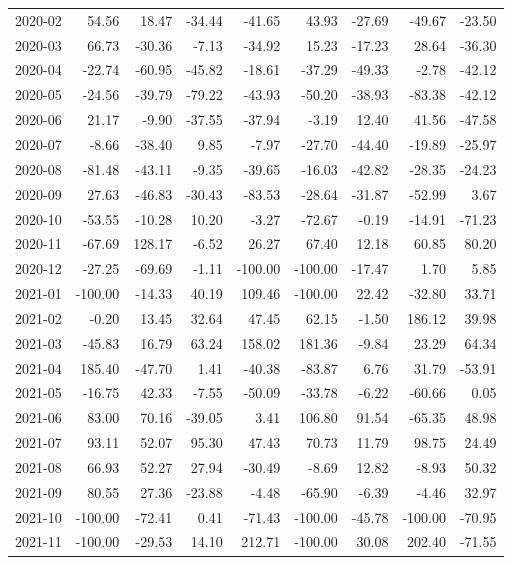 \begin{table}[ht]
\begin{tabular}{lrrrrrrrr}
  2020-02 & 54.56 & 18.47 & -34.44 & -41.65 & 43.93 & -27.69 & -49.67 & -23.50 \\ 
  2020-03 & 66.73 & -30.36 & -7.13 & -34.92 & 15.23 & -17.23 & 28.64 & -36.30 \\ 
  2020-04 & -22.74 & -60.95 & -45.82 & -18.61 & -37.29 & -49.33 & -2.78 & -42.12 \\ 
  2020-05 & -24.56 & -39.79 & -79.22 & -43.93 & -50.20 & -38.93 & -83.38 & -42.12 \\ 
  2020-06 & 21.17 & -9.90 & -37.55 & -37.94 & -3.19 & 12.40 & 41.56 & -47.58 \\ 
  2020-07 & -8.66 & -38.40 & 9.85 & -7.97 & -27.70 & -44.40 & -19.89 & -25.97 \\ 
  2020-08 & -81.48 & -43.11 & -9.35 & -39.65 & -16.03 & -42.82 & -28.35 & -24.23 \\ 
  2020-09 & 27.63 & -46.83 & -30.43 & -83.53 & -28.64 & -31.87 & -52.99 & 3.67 \\ 
  2020-10 & -53.55 & -10.28 & 10.20 & -3.27 & -72.67 & -0.19 & -14.91 & -71.23 \\ 
  2020-11 & -67.69 & 128.17 & -6.52 & 26.27 & 67.40 & 12.18 & 60.85 & 80.20 \\ 
  2020-12 & -27.25 & -69.69 & -1.11 & -100.00 & -100.00 & -17.47 & 1.70 & 5.85 \\ 
  2021-01 & -100.00 & -14.33 & 40.19 & 109.46 & -100.00 & 22.42 & -32.80 & 33.71 \\ 
  2021-02 & -0.20 & 13.45 & 32.64 & 47.45 & 62.15 & -1.50 & 186.12 & 39.98 \\ 
  2021-03 & -45.83 & 16.79 & 63.24 & 158.02 & 181.36 & -9.84 & 23.29 & 64.34 \\ 
  2021-04 & 185.40 & -47.70 & 1.41 & -40.38 & -83.87 & 6.76 & 31.79 & -53.91 \\ 
  2021-05 & -16.75 & 42.33 & -7.55 & -50.09 & -33.78 & -6.22 & -60.66 & 0.05 \\ 
  2021-06 & 83.00 & 70.16 & -39.05 & 3.41 & 106.80 & 91.54 & -65.35 & 48.98 \\ 
  2021-07 & 93.11 & 52.07 & 95.30 & 47.43 & 70.73 & 11.79 & 98.75 & 24.49 \\ 
  2021-08 & 66.93 & 52.27 & 27.94 & -30.49 & -8.69 & 12.82 & -8.93 & 50.32 \\ 
  2021-09 & 80.55 & 27.36 & -23.88 & -4.48 & -65.90 & -6.39 & -4.46 & 32.97 \\ 
  2021-10 & -100.00 & -72.41 & 0.41 & -71.43 & -100.00 & -45.78 & -100.00 & -70.95 \\ 
  2021-11 & -100.00 & -29.53 & 14.10 & 212.71 & -100.00 & 30.08 & 202.40 & -71.55 \\ 

\end{tabular}
\end{table}
